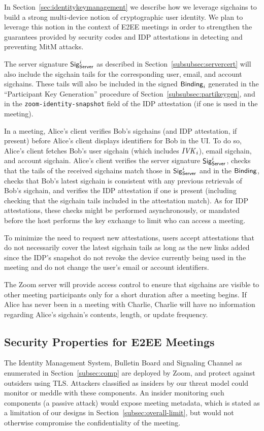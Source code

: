 In Section~\ref{sec:identitykeymanagement} we describe how we leverage sigchains to build a strong
multi-device notion of cryptographic user identity. We plan to leverage this notion in the context
of E2EE meetings in order to strengthen the guarantees provided by security codes and IDP
attestations in detecting and preventing MitM attacks.

The server signature ${\sf Sig}^i_{\mathsf{Server}}$ as described in Section~\ref{subsubsec:servercert}
will also include the sigchain tails for the corresponding user, email, and account sigchains. These
tails will also be included in the signed ${\sf Binding}_i$ generated in the ``Participant Key
Generation'' procedure of Section~\ref{subsubsec:partikeygen}, and in the
\texttt{zoom-identity-snapshot} field of the IDP attestation (if one is used in the meeting). 

In a meeting, Alice's client verifies Bob's sigchains (and IDP attestation, if present) before
Alice's client displays identifiers for Bob in the UI. To do so, Alice's client fetches Bob's user
sigchain (which includes $\mathit{IVK}_i$), email sigchain, and account sigchain. Alice's client verifies
the server signature ${\sf Sig}^i_{\mathsf{Server}}$, checks that the tails of the received sigchains
match those in ${\sf Sig}^i_{\mathsf{Server}}$ and in the ${\sf Binding}$, checks that Bob's latest sigchain
is consistent with any previous retrievals of Bob's sigchain, and verifies the IDP attestation if
one is present (including checking that the sigchain tails included in the attestation match). As
for IDP attestations, these checks might be performed asynchronously, or mandated before the host
performs the key exchange to limit who can access a meeting.

To minimize the need to request new attestations, users accept attestations that do not necessarily
cover the latest sigchain tails as long as the new links added since the IDP's snapshot do not
revoke the device currently being used in the meeting and do not change the user's email or account
identifiers.

The Zoom server will provide access control to ensure that sigchains are visible to other meeting
participants only for a short duration after a meeting begins. If Alice has never been in a meeting
with Charlie, Charlie will have no information regarding Alice's sigchain's contents, length, or
update frequency.

\subsection{Security Properties for E2EE Meetings}
\label{subsec:secprop}
The Identity Management System, Bulletin Board and Signaling Channel as enumerated in
Section~\ref{subsec:comp} are deployed by Zoom, and protect against outsiders using TLS. Attackers
classified as insiders by our threat model could monitor or meddle with these components. An insider
monitoring such components (a passive attack) would expose meeting metadata, which is stated as a
limitation of our designs in Section~\ref{subsec:overall-limit}, but would not otherwise compromise
the confidentiality of the meeting.

